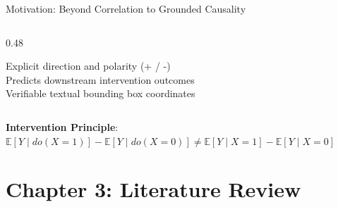 \documentclass[aspectratio=43,10pt]{beamer}
\begin{document}
\begin{frame}{Motivation: Beyond Correlation to Grounded Causality}
\begin{columns}[T]
\begin{column}{0.48\textwidth}
{        \raggedright
        \textbullet{} Explicit direction and polarity (+ / -)\\
        \textbullet{} Predicts downstream intervention outcomes\\
        \textbullet{} Verifiable textual bounding box coordinates
      }
    \end{column}
  \end{columns}
  \vspace{0.15cm}
  \begin{center}
    {\footnotesize\color{navy}\textbf{Intervention Principle}: $\mathbb{E}[Y \mid do(X=1)] - \mathbb{E}[Y \mid do(X=0)] \neq \mathbb{E}[Y \mid X=1] - \mathbb{E}[Y \mid X=0]$}
  \end{center}
\end{frame}

\section{Chapter 3: Literature Review}
\end{document}
